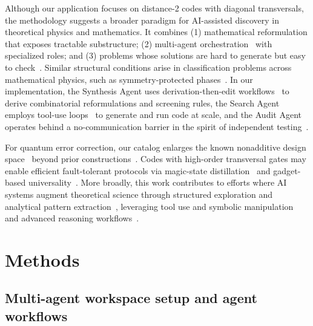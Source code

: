 \documentclass[pdflatex,sn-nature]{sn-jnl}%
\theoremstyle{thmstyleone}%
\theoremstyle{thmstyletwo}%
\theoremstyle{thmstylethree}%
\begin{document}
Although our application focuses on distance-2 codes with diagonal transversals, the methodology suggests a broader paradigm for AI-assisted discovery in theoretical physics and mathematics. It combines (1) mathematical reformulation that exposes tractable substructure; (2) multi-agent orchestration~\cite{Wu2023AutoGen,Du2023Improving} with specialized roles; and (3) problems whose solutions are hard to generate but easy to check~\cite{Glazer2024FrontierMath,Lu2025Can}. Similar structural conditions arise in classification problems across mathematical physics, such as symmetry-protected phases~\cite{Chen2013Symmetry,Zeng2019Quantum}. In our implementation, the Synthesis Agent uses derivation-then-edit workflows~\cite{Wei2022Chainofthought,Shinn2023Reflexion} to derive combinatorial reformulations and screening rules, the Search Agent employs tool-use loops~\cite{Yao2023ReAct,Schick2023Toolformer} to generate and run code at scale, and the Audit Agent operates behind a no-communication barrier in the spirit of independent testing~\cite{Jimenez2024SWEbench}. 

For quantum error correction, our catalog enlarges the known nonadditive design space~\cite{Rains1997Nonadditive,Rains2002Quantum} beyond prior constructions~\cite{Cross2009Codeword,Yu2008Nonadditive,Kubischta2023Family,Cross2025Small}. Codes with high-order transversal gates may enable efficient fault-tolerant protocols via magic-state distillation~\cite{Bravyi2005Universal} and gadget-based universality~\cite{Anderson2016Classification}. More broadly, this work contributes to efforts where AI systems augment theoretical science through structured exploration and analytical pattern extraction~\cite{Wang2023Scientific,Romera-Paredes2024Mathematical}, leveraging tool use and symbolic manipulation~\cite{Brown2020Language,OpenAI2024OpenAI} and advanced reasoning workflows~\cite{Guo2025DeepSeekR1}.

\section{Methods}
\label{sec:methods}

\subsection{Multi-agent workspace setup and agent workflows}
\label{subsec:workspace}
\end{document}
